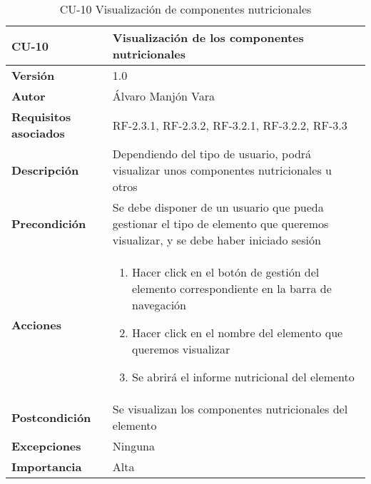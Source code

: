 \begin{table}[htp]
	\centering
	\begin{tabularx}{\linewidth}{ p{} p{} }
		\toprule
		\textbf{CU-10}    & \textbf{Visualización de los componentes nutricionales}\\
		\toprule
		\textbf{Versión}              & 1.0    \\
		\textbf{Autor}                & Álvaro Manjón Vara \\
		\textbf{Requisitos asociados} & RF-2.3.1, RF-2.3.2, RF-3.2.1, RF-3.2.2, RF-3.3 \\
		\textbf{Descripción}          & Dependiendo del tipo de usuario, podrá visualizar unos componentes nutricionales u otros \\
		\textbf{Precondición}         & Se debe disponer de un usuario que pueda gestionar el tipo de elemento que queremos visualizar, y se debe haber iniciado sesión \\
		\textbf{Acciones}             &
		\begin{enumerate}
			\def\labelenumi{\arabic{enumi}.}
			\tightlist
			\item Hacer click en el botón de gestión del elemento correspondiente en la barra de navegación
			\item Hacer click en el nombre del elemento que queremos visualizar
			\item Se abrirá el informe nutricional del elemento
		\end{enumerate}\\
		\textbf{Postcondición}        & Se visualizan los componentes nutricionales del elemento \\
		\textbf{Excepciones}          & Ninguna
 \\
		\textbf{Importancia}          & Alta \\
		\bottomrule
	\end{tabularx}
	\caption{CU-10 Visualización de componentes nutricionales}
\end{table}
\afterpage{\clearpage}

